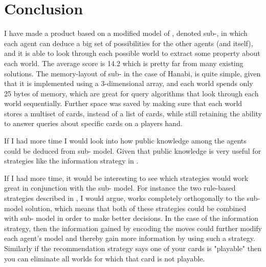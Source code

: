 \section{Conclusion}

I have made a product based on a modified model of \SfiveN{}, denoted sub-\SfiveN{}, in which each agent can deduce a big set of possibilities for the other agents (and itself), and it is able to look through each possible world to extract some property about each world.
The average score is 14.2 which is pretty far from many existing solutions.
The memory-layout of sub-\SfiveN{} in the case of Hanabi, is quite simple, given that it is implemented using a 3-dimensional array, and each world spends only 25 bytes of memory, which are great for query algorithms that look through each world sequentially.  
Further space was saved by making sure that each world stores a multiset of cards, instead of a list of cards, while still retaining the ability to answer queries about specific cards on a players hand.

If I had more time I would look into how public knowledge among the agents could be deduced from sub-\SfiveN{} model.
Given that public knowledge is very useful for strategies like the information strategy in \cite{CoxEtAl2015}.

If I had more time, it would be interesting to see which strategies would work great in conjunction with the sub-\SfiveN{} model.
For instance the two rule-based strategies described in \cite{CoxEtAl2015}, I would argue, works completely orthogonally to the sub-\SfiveN{} model solution, which means that both of these strategies could be combined with sub-\SfiveN{} model in order to make better decisions.
In the case of the information strategy, then the information gained by encoding the moves could further modify each agent's model and thereby gain more information by using such a strategy. 
Similarly if the recommendation strategy says one of your cards is "playable" then you can eliminate all worlds for which that card is not playable.

